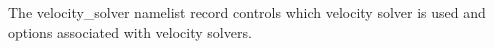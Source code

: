 The velocity\_solver namelist record controls which velocity solver is used and options associated with velocity solvers.

